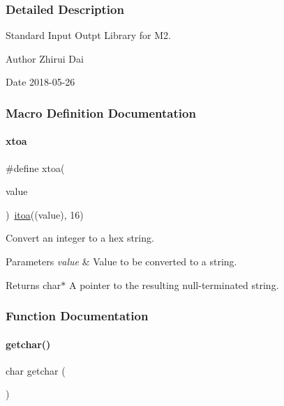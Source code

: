 \subsubsection{Detailed Description}
Standard Input Outpt Library for M2. 

\begin{DoxyAuthor}{Author}
Zhirui Dai 
\end{DoxyAuthor}
\begin{DoxyDate}{Date}
2018-\/05-\/26 
\end{DoxyDate}


\subsubsection{Macro Definition Documentation}
\mbox{\label{a00026_a3b4b01e5fa94dded508adde4ca7e5ce5}} 
\paragraph{\texorpdfstring{xtoa}{xtoa}}
{\footnotesize\ttfamily \#define xtoa(\begin{DoxyParamCaption}\item[{}]{value }\end{DoxyParamCaption})~\mbox{\hyperlink{a00026_ac399b37e5355c704e130b1c6f60b71ec}{itoa}}((value), 16)}



Convert an integer to a hex string. 


\begin{DoxyParams}{Parameters}
{\em value} & Value to be converted to a string. \\
\hline
\end{DoxyParams}
\begin{DoxyReturn}{Returns}
char$\ast$ A pointer to the resulting null-\/terminated string. 
\end{DoxyReturn}


\subsubsection{Function Documentation}
\mbox{\label{a00026_a0979671914792955a7a68461634ff82d}} 
\paragraph{\texorpdfstring{getchar()}{getchar()}}
{\footnotesize\ttfamily char getchar (\begin{DoxyParamCaption}{ }\end{DoxyParamCaption})}



